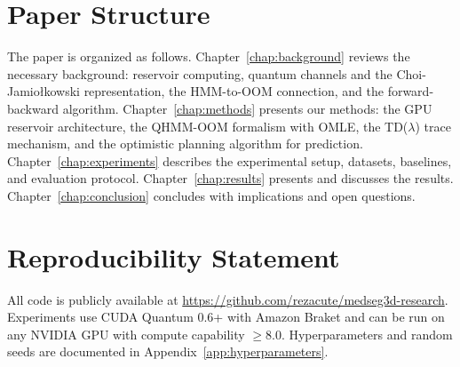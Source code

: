 
\section{Paper Structure}
\label{sec:intro:structure}

The paper is organized as follows. Chapter~\ref{chap:background}
reviews the necessary background: reservoir computing, quantum
channels and the Choi-Jamiołkowski representation, the HMM-to-OOM
connection, and the forward-backward algorithm. Chapter~\ref{chap:methods}
presents our methods: the GPU reservoir architecture, the QHMM-OOM
formalism with OMLE, the TD($\lambda$) trace mechanism, and the
optimistic planning algorithm for prediction.
Chapter~\ref{chap:experiments} describes the experimental setup,
datasets, baselines, and evaluation protocol.
Chapter~\ref{chap:results} presents and discusses the results.
Chapter~\ref{chap:conclusion} concludes with implications and open
questions.


\section*{Reproducibility Statement}
\label{sec:intro:reproducibility}

All code is publicly available at
\url{https://github.com/rezacute/medseg3d-research}. Experiments use
CUDA Quantum 0.6+ with Amazon Braket and can be run on any NVIDIA
GPU with compute capability $\geq 8.0$. Hyperparameters and random
seeds are documented in Appendix~\ref{app:hyperparameters}.
